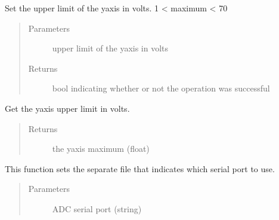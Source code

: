 \documentclass[letterpaper,10pt,english]{sphinxmanual}
\begin{document}
\begin{fulllineitems}
\label{\detokenize{settings_interface:settings_interface.set_y_axis_max}}
Set the upper limit of the y\sphinxhyphen{}axis in volts. 1 \textless{} maximum \textless{} 70
\begin{quote}\begin{description}
\item[{Parameters}] \leavevmode
{} \textendash{} upper limit of the y\sphinxhyphen{}axis in volts

\item[{Returns}] \leavevmode
bool indicating whether or not the operation was successful

\end{description}\end{quote}

\end{fulllineitems}


\begin{fulllineitems}
\label{\detokenize{settings_interface:settings_interface.get_y_axis_max}}
Get the y\sphinxhyphen{}axis upper limit in volts.
\begin{quote}\begin{description}
\item[{Returns}] \leavevmode
the y\sphinxhyphen{}axis maximum (float)

\end{description}\end{quote}

\end{fulllineitems}


\begin{fulllineitems}
\label{\detokenize{settings_interface:settings_interface.save_port_configuration}}
This function sets the separate file that indicates which serial port to use.
\begin{quote}\begin{description}
\item[{Parameters}] \leavevmode
{} \textendash{} ADC serial port (string)

\end{description}\end{quote}

\end{fulllineitems}
\end{document}
